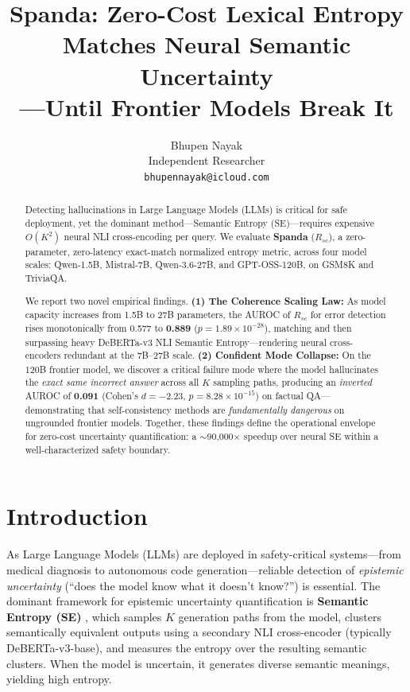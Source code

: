 \documentclass[11pt]{article}
\title{Spanda: Zero-Cost Lexical Entropy Matches Neural Semantic Uncertainty\\---Until Frontier Models Break It}
\author{
  Bhupen Nayak \\
  Independent Researcher \\
  \texttt{bhupennayak@icloud.com} \\
}
\begin{document}
\maketitle

\begin{abstract}
Detecting hallucinations in Large Language Models (LLMs) is critical for safe deployment, yet the dominant method---Semantic Entropy (SE)---requires expensive $O(K^2)$ neural NLI cross-encoding per query. We evaluate \textbf{Spanda} ($R_{sc}$), a zero-parameter, zero-latency exact-match normalized entropy metric, across four model scales: Qwen-1.5B, Mistral-7B, Qwen-3.6-27B, and GPT-OSS-120B, on GSM8K and TriviaQA.

We report two novel empirical findings. \textbf{(1) The Coherence Scaling Law:} As model capacity increases from 1.5B to 27B parameters, the AUROC of $R_{sc}$ for error detection rises monotonically from 0.577 to \textbf{0.889} ($p = 1.89 \times 10^{-28}$), matching and then surpassing heavy DeBERTa-v3 NLI Semantic Entropy---rendering neural cross-encoders redundant at the 7B--27B scale. \textbf{(2) Confident Mode Collapse:} On the 120B frontier model, we discover a critical failure mode where the model hallucinates the \textit{exact same incorrect answer} across all $K$ sampling paths, producing an \textit{inverted} AUROC of \textbf{0.091} (Cohen's $d = -2.23$, $p = 8.28 \times 10^{-15}$) on factual QA---demonstrating that self-consistency methods are \textit{fundamentally dangerous} on ungrounded frontier models. Together, these findings define the operational envelope for zero-cost uncertainty quantification: a $\sim$90,000$\times$ speedup over neural SE within a well-characterized safety boundary.
\end{abstract}

\section{Introduction}

As Large Language Models (LLMs) are deployed in safety-critical systems---from medical diagnosis to autonomous code generation---reliable detection of \textit{epistemic uncertainty} (``does the model know what it doesn't know?'') is essential. The dominant framework for epistemic uncertainty quantification is \textbf{Semantic Entropy (SE)} \cite{kuhn2023semantic}, which samples $K$ generation paths from the model, clusters semantically equivalent outputs using a secondary NLI cross-encoder (typically DeBERTa-v3-base), and measures the entropy over the resulting semantic clusters. When the model is uncertain, it generates diverse semantic meanings, yielding high entropy.
\end{document}
